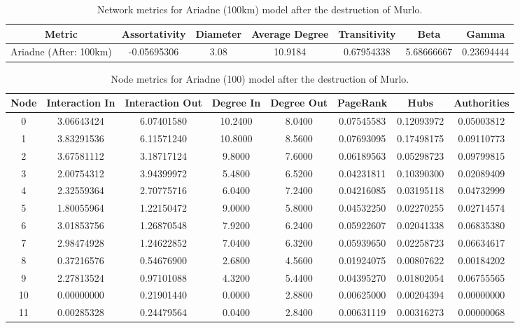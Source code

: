 \documentclass[12pt,a4paper]{thesis}
\begin{document}
\begin{table}[H]
\centering
\caption{Network metrics for Ariadne (100km) model after the destruction of Murlo.}
\tiny
\begin{tabular}{|c|c|c|c|c|c|c|}
\hline Metric & Assortativity & Diameter & Average Degree & Transitivity & Beta & Gamma \\ 
\hline Ariadne (After: 100km) & -0.05695306	& 3.08 & 10.9184 & 0.67954338 & 5.68666667	& 0.23694444
 \\ 
\hline 
\end{tabular} 
\label{tab:ariadneNetAfter100}
\end{table}

\begin{table}[H]
\centering
\caption{Node metrics for Ariadne (100) model after the destruction of Murlo.}
\tiny
\begin{tabular}{|c|c|c|c|c|c|c|c|}
\hline	Node	&	Interaction In	&	Interaction Out	&	Degree In	&	Degree Out	&	PageRank	&	Hubs	&	Authorities	\\
\hline	0	&	3.06643424	&	6.07401580	&	10.2400	&	8.0400	&	0.07545583	&	0.12093972	&	0.05003812	\\
\hline	1	&	3.83291536	&	6.11571240	&	10.8000	&	8.5600	&	0.07693095	&	0.17498175	&	0.09110773	\\
\hline	2	&	3.67581112	&	3.18717124	&	9.8000	&	7.6000	&	0.06189563	&	0.05298723	&	0.09799815	\\
\hline	3	&	2.00754312	&	3.94399972	&	5.4800	&	6.5200	&	0.04231811	&	0.10390300	&	0.02089409	\\
\hline	4	&	2.32559364	&	2.70775716	&	6.0400	&	7.2400	&	0.04216085	&	0.03195118	&	0.04732999	\\
\hline	5	&	1.80055964	&	1.22150472	&	9.0000	&	5.8000	&	0.04532250	&	0.02270255	&	0.02714574	\\
\hline	6	&	3.01853756	&	1.26870548	&	7.9200	&	6.2400	&	0.05922607	&	0.02041338	&	0.06835380	\\
\hline	7	&	2.98474928	&	1.24622852	&	7.0400	&	6.3200	&	0.05939650	&	0.02258723	&	0.06634617	\\
\hline	8	&	0.37216576	&	0.54676900	&	2.6800	&	4.5600	&	0.01924075	&	0.00807622	&	0.00184202	\\
\hline	9	&	2.27813524	&	0.97101088	&	4.3200	&	5.4400	&	0.04395270	&	0.01802054	&	0.06755565	\\
\hline	10	&	0.00000000	&	0.21901440	&	0.0000	&	2.8800	&	0.00625000	&	0.00204394	&	0.00000000	\\
\hline	11	&	0.00285328	&	0.24479564	&	0.0400	&	2.8400	&	0.00631119	&	0.00316273	&	0.00000068	\\

\end{tabular}
\end{table}
\end{document}
